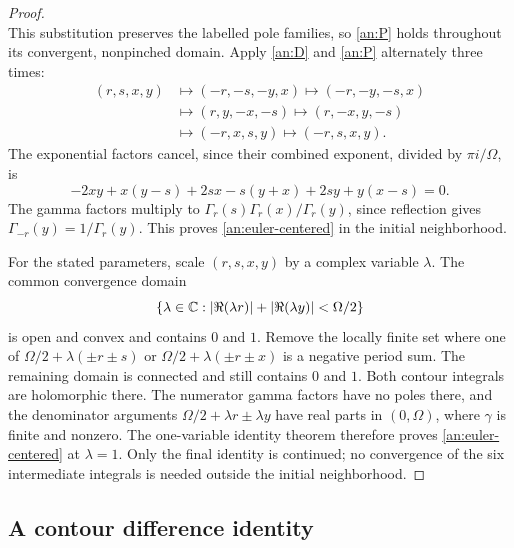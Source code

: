 \begin{proof}
\begin{equation}
\end{equation}
This substitution preserves the labelled pole families, so
\eqref{an:P} holds throughout its convergent, nonpinched domain.
Apply \eqref{an:D} and \eqref{an:P} alternately three times:
\begin{align*}
 (r,s,x,y)&\longmapsto(-r,-s,-y,x)
 \longmapsto(-r,-y,-s,x)\\
 &\longmapsto(r,y,-x,-s)
 \longmapsto(r,-x,y,-s)\\
 &\longmapsto(-r,x,s,y)
 \longmapsto(-r,s,x,y).
\end{align*}
The exponential factors cancel, since their combined exponent,
divided by $\pi i/\Omega$, is
\[
 -2xy+x(y-s)+2sx-s(y+x)+2sy+y(x-s)=0.
\]
The gamma factors multiply to
$\Gamma_r(s)\Gamma_r(x)/\Gamma_r(y)$, since reflection gives
$\Gamma_{-r}(y)=1/\Gamma_r(y)$.  This proves
\eqref{an:euler-centered} in the initial neighborhood.

For the stated parameters, scale $(r,s,x,y)$ by a complex variable
$\lambda$.  The common convergence domain
\[
 \{\lambda\in\mathbb C:
       |\Re(\lambda r)|+|\Re(\lambda y)|<\Omega/2\}
\]
is open and convex and contains $0$ and $1$.  Remove the locally
finite set where one of
$\Omega/2+\lambda(\pm r\pm s)$ or
$\Omega/2+\lambda(\pm r\pm x)$ is a negative period sum.
The remaining domain is connected and still contains $0$ and $1$.
Both contour integrals are holomorphic there.  The numerator gamma
factors have no poles there, and the denominator arguments
$\Omega/2+\lambda r\pm\lambda y$ have real parts in $(0,\Omega)$,
where $\gamma$ is finite and nonzero.  The one-variable identity
theorem therefore proves \eqref{an:euler-centered} at $\lambda=1$.
Only the final identity is continued; no convergence of the six
intermediate integrals is needed outside the initial neighborhood.
\end{proof}

\subsection{A contour difference identity}
\label{an:four-term-section}

